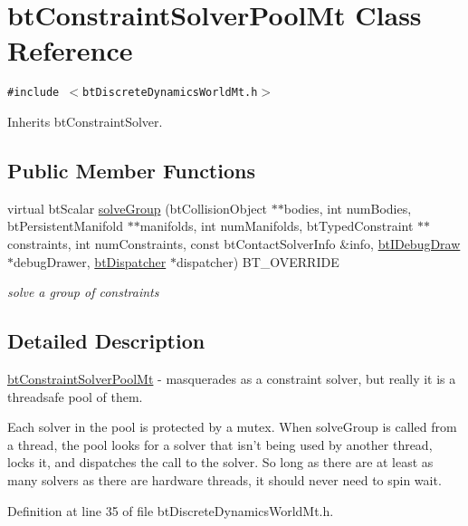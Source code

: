 \hypertarget{classbt_constraint_solver_pool_mt}{
\section{btConstraintSolverPoolMt Class Reference}
\label{classbt_constraint_solver_pool_mt}
}
{\tt \#include $<$btDiscreteDynamicsWorldMt.h$>$}

Inherits btConstraintSolver.

\subsection*{Public Member Functions}
\begin{CompactItemize}
\item 
\hypertarget{classbt_constraint_solver_pool_mt_9ec644111717d8455042b606181f7883}{
virtual btScalar \hyperlink{classbt_constraint_solver_pool_mt_9ec644111717d8455042b606181f7883}{solveGroup} (btCollisionObject $\ast$$\ast$bodies, int numBodies, btPersistentManifold $\ast$$\ast$manifolds, int numManifolds, btTypedConstraint $\ast$$\ast$constraints, int numConstraints, const btContactSolverInfo \&info, \hyperlink{classbt_i_debug_draw}{btIDebugDraw} $\ast$debugDrawer, \hyperlink{classbt_dispatcher}{btDispatcher} $\ast$dispatcher) BT\_\-OVERRIDE}
\label{classbt_constraint_solver_pool_mt_9ec644111717d8455042b606181f7883}

\begin{CompactList}\small\item\em solve a group of constraints \item\end{CompactList}\end{CompactItemize}


\subsection{Detailed Description}
\hyperlink{classbt_constraint_solver_pool_mt}{btConstraintSolverPoolMt} - masquerades as a constraint solver, but really it is a threadsafe pool of them.

Each solver in the pool is protected by a mutex. When solveGroup is called from a thread, the pool looks for a solver that isn't being used by another thread, locks it, and dispatches the call to the solver. So long as there are at least as many solvers as there are hardware threads, it should never need to spin wait. 

Definition at line 35 of file btDiscreteDynamicsWorldMt.h.

